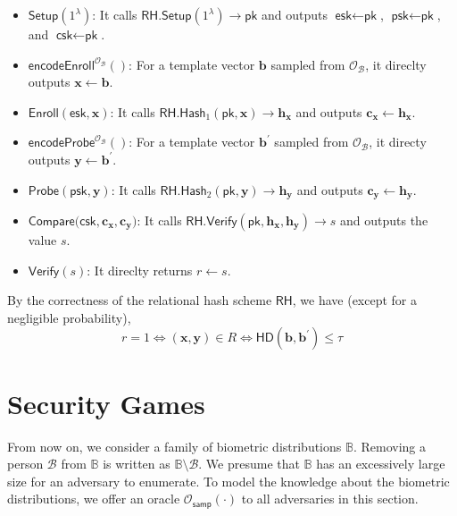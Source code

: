 \begin{itemize}

	\item $\textsf{Setup}(1^\lambda)$: It calls $\textsf{RH.Setup}(1^\lambda) \to \textsf{pk}$ and outputs $\textsf{esk} \gets \textsf{pk}$, $\textsf{psk} \gets \textsf{pk}$, and $\textsf{csk} \gets \textsf{pk}$.

	\item $\textsf{encodeEnroll}^{\mathcal{O}_{\mathcal{B}}}()$: For a template vector $\mathbf{b}$ sampled from $\mathcal{O}_\mathcal{B}$, it direclty outputs $\mathbf{x} \gets \mathbf{b}$.

	\item $\textsf{Enroll}(\textsf{esk}, \mathbf{x})$: It calls $\textsf{RH.Hash}_1(\textsf{pk}, \mathbf{x}) \to \mathbf{h_x}$ and outputs $\mathbf{c_x} \gets \mathbf{h_x}$.

	\item $\textsf{encodeProbe}^{\mathcal{O}_{\mathcal{B}}}()$: For a template vector $\mathbf{b}^\prime$ sampled from $\mathcal{O}_\mathcal{B}$, it directy outputs $\mathbf{y} \gets \mathbf{b}^\prime$.

	\item $\textsf{Probe}(\textsf{psk}, \mathbf{y})$: It calls $\textsf{RH.Hash}_2(\textsf{pk}, \mathbf{y}) \to \mathbf{h_y}$ and outputs $\mathbf{c_y} \gets \mathbf{h_y}$.

	\item $\textsf{Compare}(\textsf{csk}, \mathbf{c_x}, \mathbf{c_y)}$: It calls $\textsf{RH.Verify}(\textsf{pk}, \mathbf{h_x}, \mathbf{h_y}) \to s$ and outputs the value $s$.

	\item $\textsf{Verify}(s)$: It direclty returns $r \gets s$.

\end{itemize}

By the correctness of the relational hash scheme $\textsf{RH}$, we have (except for a negligible probability),
\[
	r = 1 \Leftrightarrow (\mathbf{x}, \mathbf{y}) \in R \Leftrightarrow \textsf{HD}(\mathbf{b}, \mathbf{b}^\prime) \leq \tau
\]




\section{Security Games}
\label{sec:security_game}

From now on, we consider a family of biometric distributions $\mathbb{B}$. Removing a person $\mathcal{B}$ from $\mathbb{B}$ is written as $\mathbb{B} \setminus \mathcal{B}$.
We presume that $\mathbb{B}$ has an excessively large size for an adversary to enumerate. To model the knowledge about the biometric distributions, we offer an oracle $\mathcal{O}_\textsf{samp}(\cdot)$ to all adversaries in this section.

